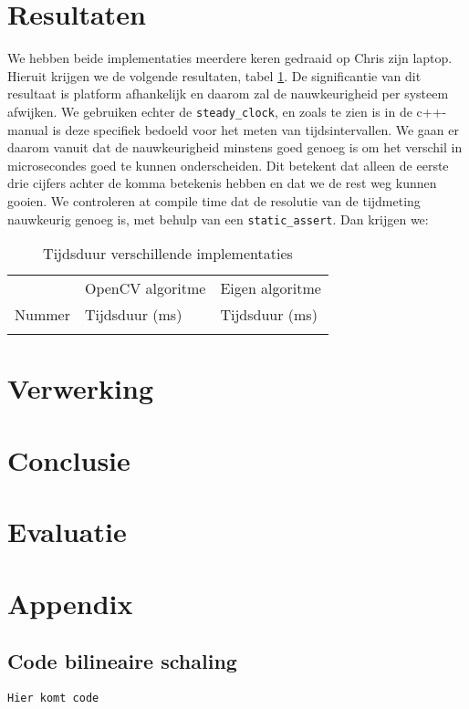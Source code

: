 \documentclass[a4paper]{article}
\begin{document}
\section{Resultaten}
\label{sec:org0e00a90}
We hebben beide implementaties meerdere keren gedraaid op Chris zijn laptop. Hieruit krijgen we de volgende resultaten, tabel \ref{tab:org4c92527}. De significantie van dit resultaat is platform afhankelijk en daarom zal de nauwkeurigheid per systeem afwijken. We gebruiken echter de \texttt{steady\_clock}, en zoals te zien is in de c++-manual is deze specifiek bedoeld voor het meten van tijdsintervallen. We gaan er daarom vanuit dat de nauwkeurigheid minstens goed genoeg is om het verschil in microsecondes goed te kunnen onderscheiden. Dit betekent dat alleen de eerste drie cijfers achter de komma betekenis hebben en dat we de rest weg kunnen gooien. We controleren at compile time dat de resolutie van de tijdmeting nauwkeurig genoeg is, met behulp van een \texttt{static\_assert}. Dan krijgen we:

\begin{table}[htbp]
\caption{\label{tab:org4c92527}
Tijdsduur verschillende implementaties}
\centering
\begin{tabular}{lll}
 & OpenCV algoritme & Eigen algoritme\\
Nummer & Tijdsduur (ms) & Tijdsduur (ms)\\
\hline
 &  & \\
\end{tabular}
\end{table}

\section{Verwerking}
\label{sec:org202cecd}

\section{Conclusie}
\label{sec:org0b254af}

\section{Evaluatie}
\label{sec:org2790bd1}

\section{Appendix}
\label{sec:orgee74037}
\subsection{Code bilineaire schaling}
\label{sec:orgee3a7f5}
\texttt{Hier komt code}
\end{document}
